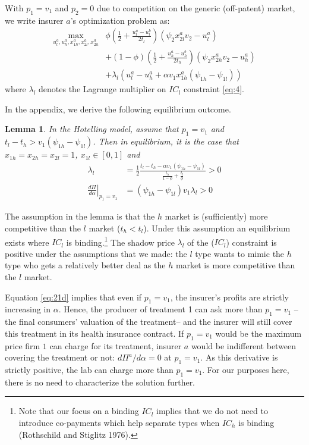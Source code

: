 \documentclass[a4paper,12pt]{article}
\makeatletter
\newtheorem{lemma}{Lemma}
\newcommand{\citeprocitem}[2]{\hyper@linkstart{cite}{citeproc_bib_item_#1}#2\hyper@linkend}
\makeatother
\begin{document}
With \(p_1=v_1\) and \(p_2=0\) due to competition on the generic (off-patent) market, we write insurer \(a\)'s optimization problem as:
\begin{align}
\nonumber
    \max_{u_l^a,u_h^a,x_{1h}^a,x_{2l}^a,x_{2h}^a} & \phi \left(\frac{1}{2} + \frac{u_l^a-u_l^b}{2t_l} \right) (\psi_2 x_{2l}^a v_2 -u_l^a) \\
    \label{eq:20}
     & + (1-\phi) \left(\frac{1}{2} + \frac{u_h^a-u_h^b}{2t_h} \right) (\psi_2 x_{2h}^a v_2 -u_h^a) \\ \nonumber
     & + \lambda_l (u_l^a - u_h^a + \alpha v_1 x_{1h}^a (\psi_{1h}-\psi_{1l}))
\end{align}
where \(\lambda_l\) denotes the Lagrange multiplier on \(IC_l\) constraint \eqref{eq:4}.

In the appendix, we derive the following equilibrium outcome.
\begin{lemma}
\label{Hotelling_equilibrium}
In the Hotelling model, assume that \(p_1 =v_1\) and \(t_l - t_h > v_1 (\psi_{1h}-\psi_{1l})\). Then in equilibrium, it is the case that \(x_{1h}=x_{2h}=x_{2l}=1\), \(x_{1l} \in [0,1]\) and
\begin{align}
\label{eq:21c}
\lambda_{l} &= \frac{1}{2} \frac{t_l-t_h-\alpha v_1 (\psi_{1h}-\psi_{1l})}{\frac{t_h}{1-\phi}+\frac{t_l}{\phi}} > 0 \\
\label{eq:21d}
\left. \frac{d\Pi}{d\alpha}\right|_{p_1=v_1} &= (\psi_{1h}-\psi_{1l}) v_1 \lambda_l > 0
\end{align}
\end{lemma}

The assumption in the lemma is that the \(h\) market is (sufficiently) more competitive than the \(l\) market (\(t_h < t_l\)). Under this assumption an equilibrium exists where \(IC_l\) is binding.\footnote{Note that our focus on a binding \(IC_l\) implies that we do not need to introduce co-payments which help separate types when \(IC_h\) is binding (\citeprocitem{37}{Rothschild and Stiglitz 1976}).} The shadow price \(\lambda_l\) of the (\(IC_l\)) constraint is positive under the assumptions that we made: the \(l\) type wants to mimic the \(h\) type who gets a relatively better deal as the \(h\) market is more competitive than the \(l\) market.

Equation \eqref{eq:21d} implies that even if \(p_1=v_1\), the insurer's profits are strictly increasing in \(\alpha\). Hence, the producer of treatment 1 can ask more than \(p_1 = v_1\) --the final consumers' valuation of the treatment-- and the insurer will still cover this treatment in its health insurance contract. If \(p_1 = v_1\) would be the maximum price firm \(1\) can charge for its treatment, insurer \(a\) would be indifferent between covering the treatment or not: \(d\Pi^{a}/d\alpha = 0\) at \(p_1 = v_1\). As this derivative is strictly positive, the lab can charge more than \(p_1=v_1\). For our purposes here, there is no need to characterize the solution further.
\end{document}
